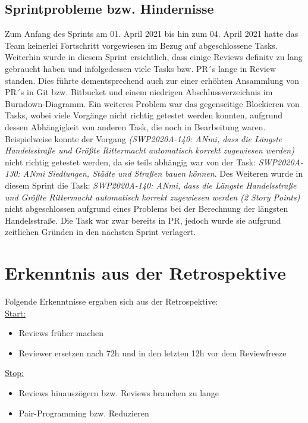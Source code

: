 \documentclass[12pt,a4paper, oneside]{article}
\begin{document}
\subsection{Sprintprobleme bzw. Hindernisse}
Zum Anfang des Sprints am 01. April 2021 bis hin zum 04. April 2021 hatte das Team keinerlei Fortschritt vorgewiesen im Bezug auf abgeschlossene Tasks.
Weiterhin wurde in diesem Sprint ersichtlich, dass einige Reviews definitv zu lang gebraucht haben und infolgedessen viele Tasks bzw. PR´s lange in Review standen.
Dies führte dementsprechend auch zur einer erhöhten Ansammlung von PR´s in Git bzw. Bitbucket und einem niedrigen Abschlussverzeichnis im Burndown-Diagramm.
Ein weiteres Problem war das gegenseitige Blockieren von Tasks, wobei viele Vorgänge nicht richtig getestet werden konnten, aufgrund dessen Abhängigkeit von anderen Task, die noch in Bearbeitung waren.
Beispielweise konnte der Vorgang \textit{ (SWP2020A-140: ANmi, dass die Längste Handelsstraße und Größte Rittermacht automatisch korrekt zugewiesen werden)} nicht richtig getestet werden, da sie teils abhängig war von der Task: \textit{SWP2020A-130: ANmi Siedlungen, Städte und Straßen bauen können}.
Des Weiteren wurde in diesem Sprint die Task: \textit{SWP2020A-140: ANmi, dass die Längste Handelsstraße und Größte Rittermacht automatisch korrekt zugewiesen werden (2 Story Points)} nicht abgeschlossen aufgrund eines Problems bei der Berechnung der längsten Handelsstraße.
Die Task war zwar bereits in PR, jedoch wurde sie aufgrund zeitlichen Gründen in den nächsten Sprint verlagert.


\section{Erkenntnis aus der Retrospektive}
Folgende Erkenntnisse ergaben sich aus der Retrospektive:\\

\underline{Start:}
\begin{itemize}
    \item Reviews früher machen
    \item Reviewer ersetzen nach 72h und in den letzten 12h vor dem Reviewfreeze
\end{itemize}

\underline{Stop:}
\begin{itemize}
    \item Reviews hinauszögern bzw. Reviews brauchen zu lange
    \item Pair-Programming bzw. Reduzieren
\end{itemize}
\end{document}
